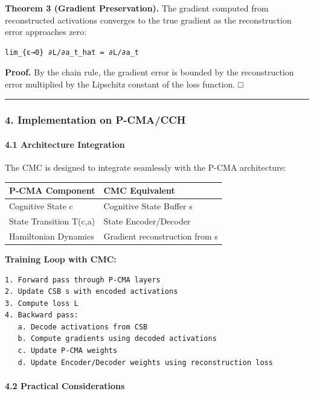 \documentclass[
  11pt,
  a4paper,
]{article}
\begin{document}
\textbf{Theorem 3 (Gradient Preservation).} The gradient computed from
reconstructed activations converges to the true gradient as the
reconstruction error approaches zero:

\begin{verbatim}
lim_{ε→0} ∂L/∂a_t_hat = ∂L/∂a_t
\end{verbatim}

\textbf{Proof.} By the chain rule, the gradient error is bounded by the
reconstruction error multiplied by the Lipschitz constant of the loss
function. □

\begin{center}\rule{0.5\linewidth}{0.5pt}\end{center}

\subsubsection{4. Implementation on
P-CMA/CCH}\label{implementation-on-p-cmacch}

\paragraph{4.1 Architecture Integration}\label{architecture-integration}

The CMC is designed to integrate seamlessly with the P-CMA architecture:

\begin{longtable}[]{@{}ll@{}}
\toprule\noalign{}
P-CMA Component & CMC Equivalent \\
\midrule\noalign{}
\endhead
\bottomrule\noalign{}
\endlastfoot
Cognitive State c & Cognitive State Buffer s \\
State Transition T(c,a) & State Encoder/Decoder \\
Hamiltonian Dynamics & Gradient reconstruction from s \\
\end{longtable}

\textbf{Training Loop with CMC:}

\begin{verbatim}
1. Forward pass through P-CMA layers
2. Update CSB s with encoded activations
3. Compute loss L
4. Backward pass:
   a. Decode activations from CSB
   b. Compute gradients using decoded activations
   c. Update P-CMA weights
   d. Update Encoder/Decoder weights using reconstruction loss
\end{verbatim}

\paragraph{4.2 Practical Considerations}\label{practical-considerations}
\end{document}
